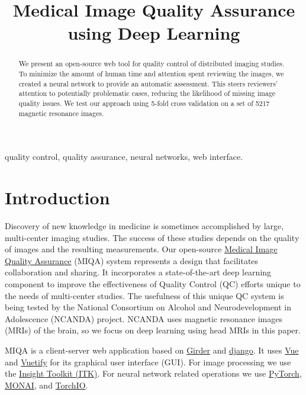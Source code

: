 \documentclass{midl} %
\title[Medical Image Quality Assurance using Deep Learning]{Medical Image Quality Assurance using Deep Learning}
\begin{document}
\maketitle

\begin{abstract}
We present an open-source web tool for quality control of distributed imaging studies.
To minimize the amount of human time and attention spent reviewing the images,
we created a neural network to provide an automatic assessment.
This steers reviewers' attention to potentially problematic cases,
reducing the likelihood of missing image quality issues.
We test our approach using 5-fold cross validation on a set of 5217 magnetic resonance images.
\end{abstract}

\begin{keywords}
quality control, quality assurance, neural networks, web interface.
\end{keywords}

\section{Introduction}

Discovery of new knowledge in medicine is sometimes accomplished by large, multi-center imaging studies. The success of these studies depends on the quality of images and the resulting measurements. 
Our open-source \href{https://github.com/OpenImaging/miqa}{Medical Image Quality Assurance} (MIQA) system represents a design that facilitates collaboration and sharing. It incorporates a state-of-the-art deep learning component to improve the effectiveness of Quality Control (QC) efforts unique to the needs of multi-center studies. The usefulness of this unique QC system is being tested by the National Consortium on Alcohol and Neurodevelopment in Adolescence (NCANDA) project. NCANDA uses magnetic resonance images (MRIs) of the brain, so we focus on deep learning using head MRIs in this paper.

MIQA is a client-server web application based on \href{https://github.com/girder/girder}{Girder} and \href{https://www.django-rest-framework.org/}{django}. It uses \href{https://vuejs.org/}{Vue} and \href{https://vuetifyjs.com/}{Vuetify} for its graphical user interface (GUI). For image processing we use the \href{https://itk.org/}{Insight Toolkit (ITK)}. For neural network related operations we use \href{https://pytorch.org/}{PyTorch}, \href{https://monai.io/}{MONAI}, and \href{https://torchio.readthedocs.io/}{TorchIO}.
\end{document}
